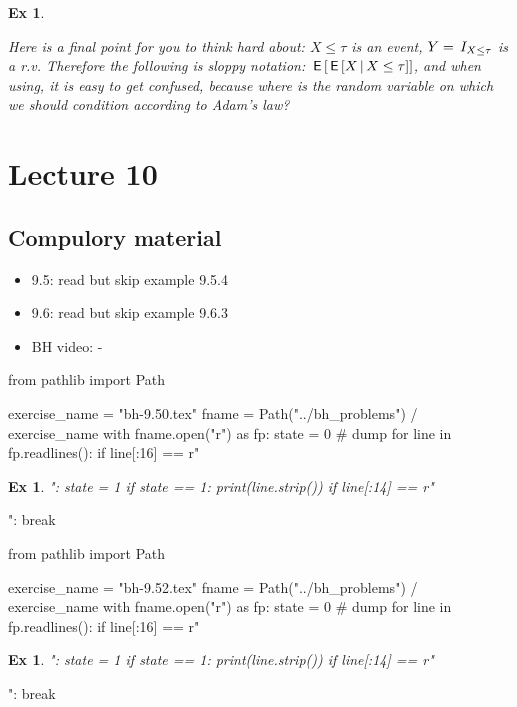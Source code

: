 \documentclass[a4paper,11pt]{article}
\newtheorem{exercise}[theorem]{Ex}
\begin{document}
\begin{exercise}
\begin{solution}
Here is a final point for you to think hard about: ${X\leq \tau}$ is an event, $Y=\,I_{X \leq \tau}$ is a r.v. Therefore the following is sloppy notation: $\,\mathsf{E}\left[\,\mathsf{E}\left[X\,\middle|\, X\leq \tau\right]\right]$, and when using, it is easy to get confused, because where is the random variable  on which we  should condition according to Adam's law?
\end{solution}
\end{exercise}



\section{Lecture 10}

\subsection{Compulory material}
\label{sec:compulory-material}


\begin{itemize}
\item 9.5: read but skip example 9.5.4
\item 9.6: read but skip example 9.6.3
\item BH video: -
\end{itemize}



\begin{pycode}
from pathlib import Path

exercise_name = "bh-9.50.tex"
fname = Path("../bh_problems") / exercise_name
with fname.open("r") as fp:
    state = 0  # dump
    for line in fp.readlines():
        if line[:16] == r"\begin{exercise}":
            state = 1
        if state == 1:
            print(line.strip())
        if line[:14] == r"\end{exercise}":
            break
\end{pycode}


\begin{pycode}
from pathlib import Path

exercise_name = "bh-9.52.tex"
fname = Path("../bh_problems") / exercise_name
with fname.open("r") as fp:
    state = 0  # dump
    for line in fp.readlines():
        if line[:16] == r"\begin{exercise}":
            state = 1
        if state == 1:
            print(line.strip())
        if line[:14] == r"\end{exercise}":
            break
\end{pycode}
\end{document}
